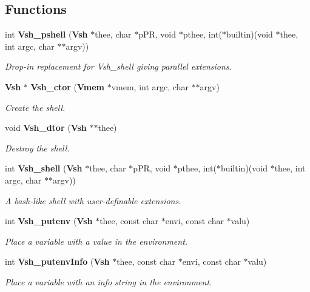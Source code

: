 \subsection*{Functions}
\begin{DoxyCompactItemize}
\item 
int {\bf Vsh\_\-pshell} ({\bf Vsh} $\ast$thee, char $\ast$pPR, void $\ast$pthee, int($\ast$builtin)(void $\ast$thee, int argc, char $\ast$$\ast$argv))
\begin{DoxyCompactList}\small\item\em Drop-\/in replacement for Vsh\_\-shell giving parallel extensions. \item\end{DoxyCompactList}\item 
{\bf Vsh} $\ast$ {\bf Vsh\_\-ctor} ({\bf Vmem} $\ast$vmem, int argc, char $\ast$$\ast$argv)
\begin{DoxyCompactList}\small\item\em Create the shell. \item\end{DoxyCompactList}\item 
void {\bf Vsh\_\-dtor} ({\bf Vsh} $\ast$$\ast$thee)
\begin{DoxyCompactList}\small\item\em Destroy the shell. \item\end{DoxyCompactList}\item 
int {\bf Vsh\_\-shell} ({\bf Vsh} $\ast$thee, char $\ast$pPR, void $\ast$pthee, int($\ast$builtin)(void $\ast$thee, int argc, char $\ast$$\ast$argv))
\begin{DoxyCompactList}\small\item\em A bash-\/like shell with user-\/definable extensions. \item\end{DoxyCompactList}\item 
int {\bf Vsh\_\-putenv} ({\bf Vsh} $\ast$thee, const char $\ast$envi, const char $\ast$valu)
\begin{DoxyCompactList}\small\item\em Place a variable with a value in the environment. \item\end{DoxyCompactList}\item 
int {\bf Vsh\_\-putenvInfo} ({\bf Vsh} $\ast$thee, const char $\ast$envi, const char $\ast$valu)
\begin{DoxyCompactList}\small\item\em Place a variable with an info string in the environment. \item\end{DoxyCompactList}\item 

\end{DoxyCompactItemize}
